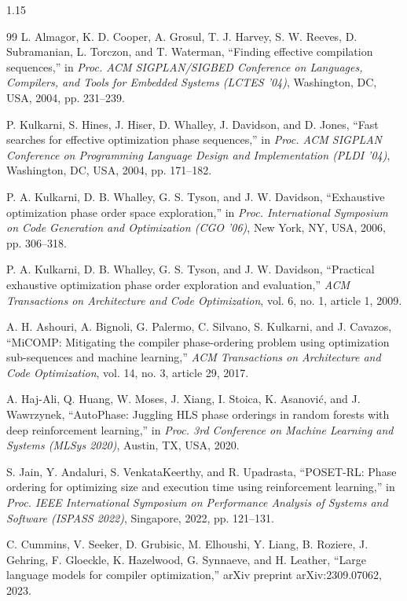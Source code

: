 \begin{spacing}{1.15}
\begin{thebibliography}{99}
 L. Almagor, K. D. Cooper, A. Grosul, T. J. Harvey, S. W. Reeves, D. Subramanian, L. Torczon, and T. Waterman, ``Finding effective compilation sequences,'' in \emph{Proc. ACM SIGPLAN/SIGBED Conference on Languages, Compilers, and Tools for Embedded Systems (LCTES '04)}, Washington, DC, USA, 2004, pp. 231--239.

 P. Kulkarni, S. Hines, J. Hiser, D. Whalley, J. Davidson, and D. Jones, ``Fast searches for effective optimization phase sequences,'' in \emph{Proc. ACM SIGPLAN Conference on Programming Language Design and Implementation (PLDI '04)}, Washington, DC, USA, 2004, pp. 171--182.

 P. A. Kulkarni, D. B. Whalley, G. S. Tyson, and J. W. Davidson, ``Exhaustive optimization phase order space exploration,'' in \emph{Proc. International Symposium on Code Generation and Optimization (CGO '06)}, New York, NY, USA, 2006, pp. 306--318.

 P. A. Kulkarni, D. B. Whalley, G. S. Tyson, and J. W. Davidson, ``Practical exhaustive optimization phase order exploration and evaluation,'' \emph{ACM Transactions on Architecture and Code Optimization}, vol. 6, no. 1, article 1, 2009.

 A. H. Ashouri, A. Bignoli, G. Palermo, C. Silvano, S. Kulkarni, and J. Cavazos, ``MiCOMP: Mitigating the compiler phase-ordering problem using optimization sub-sequences and machine learning,'' \emph{ACM Transactions on Architecture and Code Optimization}, vol. 14, no. 3, article 29, 2017.

 A. Haj-Ali, Q. Huang, W. Moses, J. Xiang, I. Stoica, K. Asanovi\'{c}, and J. Wawrzynek, ``AutoPhase: Juggling HLS phase orderings in random forests with deep reinforcement learning,'' in \emph{Proc. 3rd Conference on Machine Learning and Systems (MLSys 2020)}, Austin, TX, USA, 2020.

 S. Jain, Y. Andaluri, S. VenkataKeerthy, and R. Upadrasta, ``POSET-RL: Phase ordering for optimizing size and execution time using reinforcement learning,'' in \emph{Proc. IEEE International Symposium on Performance Analysis of Systems and Software (ISPASS 2022)}, Singapore, 2022, pp. 121--131.

 C. Cummins, V. Seeker, D. Grubisic, M. Elhoushi, Y. Liang, B. Roziere, J. Gehring, F. Gloeckle, K. Hazelwood, G. Synnaeve, and H. Leather, ``Large language models for compiler optimization,'' arXiv preprint arXiv:2309.07062, 2023.


\end{thebibliography}
\end{spacing}
